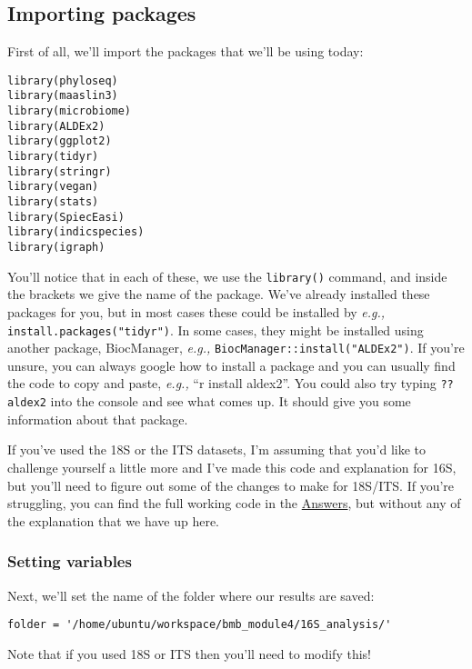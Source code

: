 \documentclass[
]{book}
\begin{document}
\subsection{Importing packages}\label{importing-packages}

First of all, we'll import the packages that we'll be using today:

\begin{verbatim}
library(phyloseq)
library(maaslin3)
library(microbiome)
library(ALDEx2)
library(ggplot2)
library(tidyr)
library(stringr)
library(vegan)
library(stats)
library(SpiecEasi)
library(indicspecies)
library(igraph)
\end{verbatim}

You'll notice that in each of these, we use the \texttt{library()} command, and inside the brackets we give the name of the package. We've already installed these packages for you, but in most cases these could be installed by \emph{e.g.,} \texttt{install.packages("tidyr")}. In some cases, they might be installed using another package, BiocManager, \emph{e.g.,} \texttt{BiocManager::install("ALDEx2")}. If you're unsure, you can always google how to install a package and you can usually find the code to copy and paste, \emph{e.g.,} ``r install aldex2''. You could also try typing \texttt{??aldex2} into the console and see what comes up. It should give you some information about that package.

If you've used the 18S or the ITS datasets, I'm assuming that you'd like to challenge yourself a little more and I've made this code and explanation for 16S, but you'll need to figure out some of the changes to make for 18S/ITS. If you're struggling, you can find the full working code in the \hyperref[answers]{Answers}, but without any of the explanation that we have up here.

\subsubsection{Setting variables}\label{setting-variables}

Next, we'll set the name of the folder where our results are saved:

\begin{verbatim}
folder = '/home/ubuntu/workspace/bmb_module4/16S_analysis/'
\end{verbatim}

Note that if you used 18S or ITS then you'll need to modify this!
\end{document}
